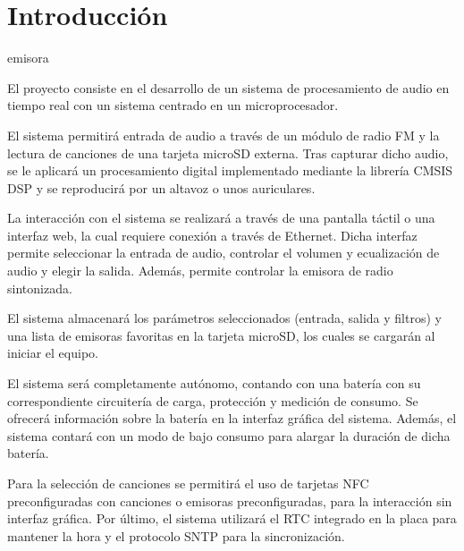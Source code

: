 \section{Introducción}

emisora

El proyecto consiste en el desarrollo de un sistema de procesamiento de audio en tiempo real con un sistema centrado en un microprocesador.

El sistema permitirá entrada de audio a través de un módulo de radio FM y la lectura de canciones de una tarjeta microSD externa. Tras capturar dicho audio, se le aplicará un procesamiento digital implementado mediante la librería CMSIS DSP y se reproducirá por un altavoz o unos auriculares.

La interacción con el sistema se realizará a través de una pantalla táctil o una interfaz web, la cual requiere conexión a través de Ethernet. Dicha interfaz permite seleccionar la entrada de audio, controlar el volumen y ecualización de audio y elegir la salida. Además, permite controlar la emisora de radio sintonizada.

El sistema almacenará los parámetros seleccionados (entrada, salida y filtros) y una lista de emisoras favoritas en la tarjeta microSD, los cuales se cargarán al iniciar el equipo.

El sistema será completamente autónomo, contando con una batería con su correspondiente circuitería de carga, protección y medición de consumo. Se ofrecerá información sobre la batería en la interfaz gráfica del sistema. Además, el sistema contará con un modo de bajo consumo para alargar la duración de dicha batería.

Para la selección de canciones se permitirá el uso de tarjetas NFC preconfiguradas con canciones o emisoras preconfiguradas, para la interacción sin interfaz gráfica. Por último, el sistema utilizará el RTC integrado en la placa para mantener la hora y el protocolo SNTP para la sincronización.

